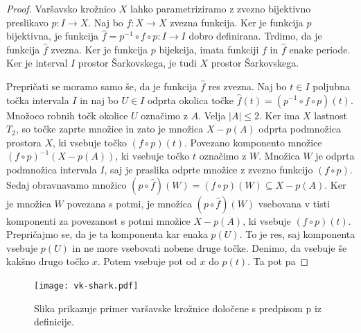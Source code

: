 \documentclass[../TG_magistrsko_delo_sections.tex]{subfiles}
\begin{document}
\begin{proof}
Varšavsko krožnico $X$ lahko parametriziramo z zvezno bijektivno preslikavo $p:I \to X$. Naj bo $f: X \to X$ zvezna funkcija. Ker je funkcija $p$ bijektivna, je funkcija $\widehat{f} = p^{-1} \circ f \circ p : I \to I$ dobro definirana. Trdimo, da je funkcija $\widehat{f}$ zvezna. Ker je funkcija $p$ bijekcija, imata funkciji $f$ in $\widehat{f}$ enake periode. Ker je interval $I$ prostor Šarkovskega, je tudi $X$ prostor Šarkovskega. 

Prepričati se moramo samo še, da je funkcija $\widehat{f}$ res zvezna. Naj bo $t \in I$ poljubna točka intervala $I$ in naj bo $U \in I$ odprta okolica točke $\widehat{f}(t) = (p^{-1} \circ f \circ p)(t)$. Množoco robnih točk okolice $U$ označimo z $A$. Velja $|A| \leq 2$. Ker ima $X$ lastnost $T_2$, so točke zaprte množice in zato je množica $X - p(A)$ odprta podmnožica prostora $X$, ki vsebuje točko $(f \circ p)(t)$. Povezano komponento množice $(f \circ p)^{-1}(X-p(A))$, ki vsebuje točko $t$ označimo z $W$. Množica $W$ je odprta podmnožica intervala $I$, saj je praslika odprte množice z zvezno funkcijo $(f \circ p)$. Sedaj obravnavamo množico $\left(p \circ \widehat{f}\right) (W) = (f \circ p)(W) \subseteq X - p(A)$. Ker je množica $W$ povezana s potmi, je množica $\left(p \circ \widehat{f} \right) (W)$ vsebovana v tisti komponenti za povezanost s potmi množice $X-p(A)$, ki vsebuje $(f \circ p)(t)$. 
Prepričajmo se, da je ta komponenta kar enaka $p(U)$. To je res, saj komponenta vsebuje $p(U)$ in ne more vsebovati nobene druge točke. Denimo, da vsebuje še kakšno drugo točko $x$. Potem vsebuje pot od $x$ do $p(t)$. Ta pot pa  
\end{proof}

\begin{figure}[h]
  \centering
  \texttt{[image: vk-shark.pdf]}
  \caption[Varšavska krožnica]{Slika prikazuje primer varšavske krožnice določene s predpisom p iz definicije.}
  \label{fig:varšavski}
\end{figure}
\end{document}

